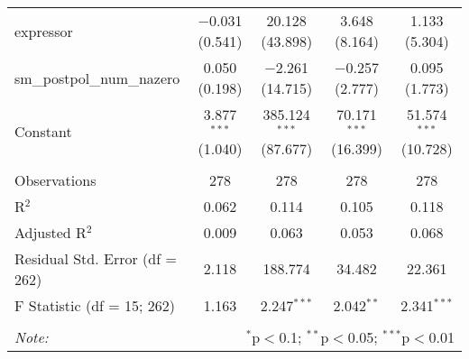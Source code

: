 \begin{table}[H]
\begin{tabular}{@{\extracolsep{5pt}}lcccc}
  expressor & $-$0.031 (0.541) & 20.128 (43.898) & 3.648 (8.164) & 1.133 (5.304) \\ 
  sm\_postpol\_num\_nazero & 0.050 (0.198) & $-$2.261 (14.715) & $-$0.257 (2.777) & 0.095 (1.773) \\ 
  Constant & 3.877$^{***}$ (1.040) & 385.124$^{***}$ (87.677) & 70.171$^{***}$ (16.399) & 51.574$^{***}$ (10.728) \\ 
 \hline \\[-1.8ex] 
Observations & 278 & 278 & 278 & 278 \\ 
R$^{2}$ & 0.062 & 0.114 & 0.105 & 0.118 \\ 
Adjusted R$^{2}$ & 0.009 & 0.063 & 0.053 & 0.068 \\ 
Residual Std. Error (df = 262) & 2.118 & 188.774 & 34.482 & 22.361 \\ 
F Statistic (df = 15; 262) & 1.163 & 2.247$^{***}$ & 2.042$^{**}$ & 2.341$^{***}$ \\ 
\hline 
\hline \\[-1.8ex] 
\textit{Note:}  & \multicolumn{4}{r}{$^{*}$p$<$0.1; $^{**}$p$<$0.05; $^{***}$p$<$0.01} \\ 
\end{tabular} 
\end{table} 
